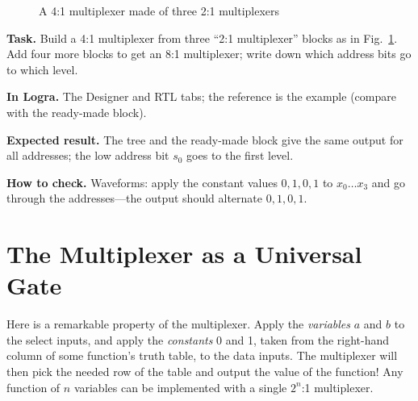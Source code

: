 \begin{figure}[H]
\centering
{}
\caption{A 4:1 multiplexer made of three 2:1 multiplexers}
\label{fig:muxtree}
\end{figure}

\begin{diybox}
\textbf{Task.}  Build a 4:1 multiplexer from three ``2:1 multiplexer''
blocks as in Fig.~\ref{fig:muxtree}.  Add four more blocks to get an
8:1 multiplexer; write down which address bits go to which level.

\textbf{In Logra.} The Designer and RTL tabs; the reference is the example
 (compare with the ready-made block).

\textbf{Expected result.} The tree and the ready-made block give the same
output for all addresses; the low address bit $s_0$ goes to the first level.

\textbf{How to check.} Waveforms: apply the constant values $0,1,0,1$ to
$x_0\ldots x_3$ and go through the addresses---the output should alternate
$0,1,0,1$.
\end{diybox}

\section{The Multiplexer as a Universal Gate}

Here is a remarkable property of the multiplexer. Apply the \emph{variables}
$a$ and $b$ to the select inputs, and apply the \emph{constants} 0 and 1,
taken from the right-hand column of some function's truth table, to the data
inputs. The multiplexer will then pick the needed row of the table and output
the value of the function! Any function of $n$ variables can be implemented with
a single $2^n$:1 multiplexer.

